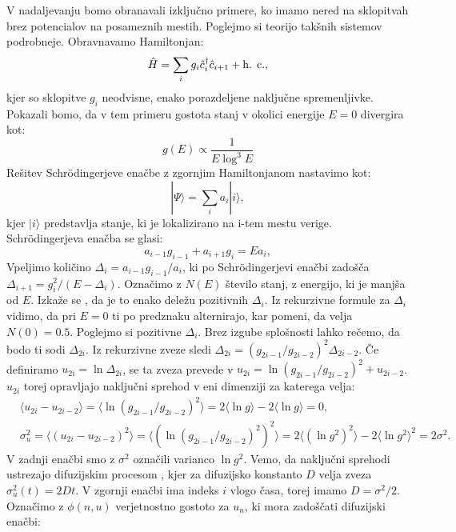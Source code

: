 V nadaljevanju bomo obranavali izključno primere, ko imamo nered na sklopitvah brez potencialov na posameznih mestih. Poglejmo si teorijo takšnih sistemov podrobneje.
Obravnavamo Hamiltonjan:
\begin{equation}
\hat{H} = \sum_i g_i \hat{c}_i^\dagger \hat{c}_{i+1} + \textup{h. c.},
\end{equation}
kjer so sklopitve $g_i$ neodvisne, enako porazdeljene naključne spremenljivke.
Pokazali bomo, da v tem primeru gostota stanj v okolici energije $E=0$ divergira kot:
\begin{equation}
g(E) \propto \frac{1}{E \log^3 E}
\end{equation}
Rešitev Schrödingerjeve enačbe z zgornjim Hamiltonjanom nastavimo kot:
\begin{equation}
| \Psi \rangle = \sum_i a_i  | i \rangle,
\end{equation}
kjer $|i \rangle$ predstavlja stanje, ki je lokalizirano na i-tem mestu verige.
Schrödingerjeva enačba se glasi:
\begin{equation}
a_{i-1} g_{i-1} + a_{i+1} g_i = E a_i,
\end{equation}
Vpeljimo količino $\Delta_i = a_{i-1} g_{i-1} / a_i$, ki po Schrödingerjevi enačbi zadošča $\Delta_{i+1} = g_i^2 / (E- \Delta_i)$. Označimo z $N(E)$ število stanj, z energijo, ki je manjša od $E$. Izkaže se \cite{dokazgostota}, da je to enako deležu pozitivnih $\Delta_i$. Iz rekurzivne formule za $\Delta_i$ vidimo, da pri $E=0$ ti po predznaku alternirajo, kar pomeni, da velja $N(0) = 0.5$.
Poglejmo si pozitivne $\Delta_i$. Brez izgube splošnosti lahko rečemo, da bodo ti sodi $\Delta_{2i}$.
Iz rekurzivne zveze sledi $\Delta_{2i} = (g_{2i-1}/g_{2i-2})^2 \Delta_{2i-2}$.
Če definiramo $u_{2i} = \ln \Delta_{2i}$, se ta zveza prevede v $u_{2i} = \ln (g_{2i-1}/g_{2i-2})^2 + u_{2i-2}$.
$u_{2i}$ torej opravljajo naključni sprehod v eni dimenziji za katerega velja:
\begin{align}
&\langle u_{2i} - u_{2i-2} \rangle = \langle \ln (g_{2i-1}/g_{2i-2})^2 \rangle = 2 \langle \ln g \rangle - 2 \langle \ln g \rangle = 0, \\
&\sigma_u^2 = \langle (u_{2i} - u_{2i-2})^2 \rangle = \langle (\ln (g_{2i-1}/g_{2i-2})^2)^2 \rangle = 2 \langle (\ln g^2)^2 \rangle - 2 \langle \ln g^2 \rangle^2 = 2 \sigma^2. 
\end{align}
V zadnji enačbi smo z $\sigma^2$ označili varianco $\ln g^2$.
Vemo, da naključni sprehodi ustrezajo difuzijskim procesom \cite{diffusion}, kjer za difuzijsko konstanto $D$ velja zveza $\sigma_u^2(t) = 2Dt$. V zgornji enačbi ima indeks $i$ vlogo časa, torej imamo $D=\sigma^2 / 2$. Označimo z $\phi (n, u)$ verjetnostno gostoto za $u_n$, ki mora zadoščati difuzijski enačbi:
